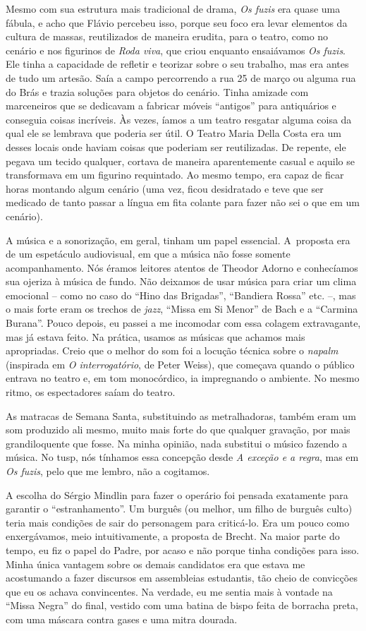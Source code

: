 Mesmo com sua estrutura mais tradicional de drama, {\it Os fuzis} era
quase uma fábula, e acho que Flávio percebeu isso, porque seu foco
era levar elementos da cultura de massas, reutilizados de
maneira erudita, para o teatro, como no cenário e nos figurinos de {\it Roda viva}, que
criou enquanto ensaiávamos {\it Os fuzis}. Ele tinha a capacidade de
refletir e teorizar sobre o seu trabalho, mas era antes de tudo um
artesão. Saía a campo percorrendo a rua 25 de março ou alguma rua do
Brás e trazia soluções para objetos do cenário. Tinha amizade com
marceneiros que se dedicavam a fabricar móveis “antigos” para
antiquários e conseguia coisas incríveis. Às vezes, íamos a um teatro
resgatar alguma coisa da qual ele se lembrava que poderia ser útil. O
Teatro Maria Della Costa era um desses locais onde haviam coisas que
poderiam ser reutilizadas. De repente, ele pegava um tecido qualquer,
cortava de maneira aparentemente casual e aquilo se transformava em um
figurino requintado. Ao mesmo tempo, era capaz de ficar horas montando
algum cenário (uma vez, ficou desidratado e teve que ser medicado de
tanto passar a língua em fita colante para fazer não sei o que em um
cenário).

A música e a sonorização, em geral, tinham um papel essencial. A~proposta
era de um espetáculo audiovisual, em que a música não fosse somente
acompanhamento. Nós éramos leitores atentos de Theodor Adorno e conhecíamos sua
ojeriza à música de fundo. Não deixamos de usar música para criar um
clima emocional -- como no caso do “Hino das Brigadas”,
“Bandiera Rossa” etc. --, mas o mais forte eram os trechos de
{\it jazz}, “Missa em Si Menor” de Bach e a “Carmina Burana”. Pouco
depois, eu passei a me incomodar com essa colagem extravagante, mas já
estava feito. Na prática, usamos as músicas que achamos mais
apropriadas. Creio que o melhor do som foi a locução técnica sobre
o {\it napalm} (inspirada em {\it O interrogatório}, de Peter Weiss), que
começava quando o público entrava no teatro e, em tom monocórdico, ia
impregnando o ambiente. No mesmo ritmo, os espectadores saíam do
teatro.

As matracas de Semana Santa, substituindo as metralhadoras, também eram um
som produzido ali mesmo, muito mais forte do que qualquer gravação, por
mais grandiloquente que fosse. Na minha opinião, nada substitui o músico
fazendo a música. No {\sc tusp}, nós tínhamos essa concepção desde {\it A
exceção e a regra}, mas em {\it Os fuzis}, pelo que me lembro, não a
cogitamos.

A escolha do Sérgio Mindlin para fazer o operário foi pensada
exatamente para garantir o “estranhamento”. Um burguês (ou melhor, um
filho de burguês culto) teria mais condições de sair do personagem para
criticá-lo. Era um pouco como enxergávamos, meio intuitivamente, a
proposta de Brecht. Na maior parte do tempo, eu fiz o papel do Padre, por
acaso e não porque tinha condições para isso. Minha única vantagem sobre
os demais candidatos era que estava me acostumando a fazer discursos em
assembleias estudantis, tão cheio de convicções que eu os achava convincentes.
Na verdade, eu me sentia mais à vontade na “Missa Negra” do final,
vestido com uma batina de bispo feita de borracha preta, com uma máscara
contra gases e uma mitra dourada.

